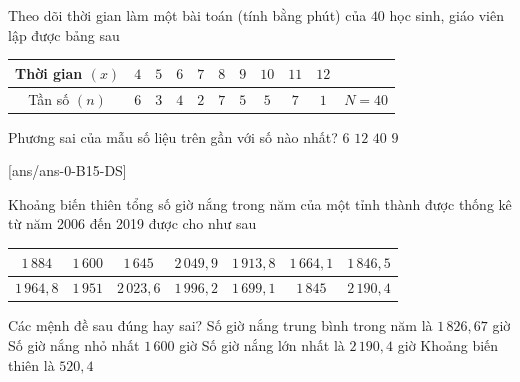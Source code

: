 \begin{ex}%
	Theo dõi thời gian làm một bài toán (tính bằng phút) của $40$ học sinh, giáo viên lập được bảng sau
	\begin{center}
		\begin{tabular}{|c|c|c|c|c|c|c|c|c|c|c|}
			\hline Thời gian $(x)$	& $4$ & $5$ & $6$ & $7$ & $8$ & $9$ & $10$ & $11$ & $12$ & \\
			\hline Tần số $(n)$		& $6$ & $3$ & $4$ & $2$ & $7$ & $5$ & $5$ & $7$ & $1$ & $N=40$\\
			\hline 
		\end{tabular}
	\end{center}
	Phương sai của mẫu số liệu trên gần với số nào nhất? 
	\choice
	{\True $6$}
	{$12$}
	{$40$}
	{$9$}
\end{ex}	


\cauds
{}[ans/ans-0-B15-DS]
\begin{ex}%
	Khoảng biến thiên tổng số giờ nắng trong năm của một tỉnh thành được thống kê từ năm 2006 đến 2019 được cho như sau
	\begin{center}
		\begin{tabular}{|c|c|c|c|c|c|c|}
			\hline $1 \, 884$ & $1\, 600$ & $1\, 645$ & $2\, 049{,}9$ & $1\, 913{,}8$ & $1\, 664{,}1$ & $1\, 846{,}5$  \\
			\hline $1\, 964{,}8$ & $1\, 951$ & $2\, 023{,}6$ & $1\, 996{,}2$ & $1\, 699{,}1$ & $1\, 845$ & $2\, 190{,}4$ \\
			\hline 
		\end{tabular}
	\end{center}
	Các mệnh đề sau đúng hay sai?
	\choiceTF
	{Số giờ nắng trung bình trong năm là $1\, 826{,}67$ giờ}
	{\True Số giờ nắng nhỏ nhất $1\, 600$ giờ}
	{\True Số giờ nắng lớn nhất là $2\, 190{,}4$ giờ}
	{Khoảng biến thiên là $520{,}4$}
\end{ex}

